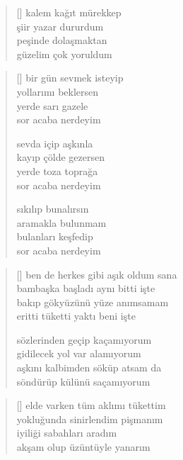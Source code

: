 \documentclass[10pt, openright, twoside]{memoir}
\theoremstyle{definition}
\begin{document}
\vspace*{\fill}
%
\newpage
{}
\vspace*{\fill}
\settowidth{\versewidth}{kalem kağıt mürekkep}
\begin{verse}[\versewidth]
  kalem kağıt mürekkep \\
  şiir yazar dururdum \\
  peşinde dolaşmaktan \\
  güzelim çok yoruldum
\end{verse}
\vspace*{\fill}
%
\newpage
{}
\vspace*{\fill}
\settowidth{\versewidth}{bir gün sevmek isteyip}
\begin{verse}[\versewidth]
  bir gün sevmek isteyip \\
  yollarımı beklersen \\
  yerde sarı gazele \\
  sor acaba nerdeyim

  sevda içip aşkınla \\
  kayıp çölde gezersen \\
  yerde toza toprağa \\
  sor acaba nerdeyim

  sıkılıp bunalırsın \\
  aramakla bulunmam \\
  bulanları keşfedip \\
  sor acaba nerdeyim
\end{verse}
\vspace*{\fill}
%
\newpage
{}
\vspace*{\fill}
\settowidth{\versewidth}{ben de herkes gibi aşık oldum sana}
\begin{verse}[\versewidth]
  ben de herkes gibi aşık oldum sana \\
  bambaşka başladı aynı bitti işte \\
  bakıp gökyüzünü yüze anımsamam \\
  eritti tüketti yaktı beni işte

  sözlerinden geçip kaçamıyorum \\
  gidilecek yol var alamıyorum \\
  aşkını kalbimden söküp atsam da \\
  söndürüp külünü saçamıyorum
\end{verse}
\vspace*{\fill}
%
\newpage
{}
\vspace*{\fill}
\settowidth{\versewidth}{elde varken tüm aklımı tükettim}
\begin{verse}[\versewidth]
  elde varken tüm aklımı tükettim \\
  yokluğunda sinirlendim pişmanım \\
  iyiliği sabahları aradım \\
  akşam olup üzüntüyle yanarım
\end{verse}
\vspace*{\fill}
%
\newpage
\end{document}
